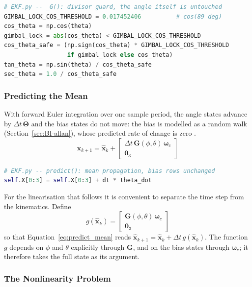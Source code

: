 \documentclass[12pt,a4paper]{article}
\newcommand{\bx}{\bm{x}}
\newcommand{\bG}{\bm{G}}
\newcommand{\bomega}{\bm{\omega}}
\newcommand{\bTheta}{\bm{\Theta}}
\begin{document}
{\begin{lstlisting}[language=Python]
# EKF.py -- _G(): divisor guard, the angle itself is untouched
GIMBAL_LOCK_COS_THRESHOLD = 0.017452406          # cos(89 deg)
cos_theta = np.cos(theta)
gimbal_lock = abs(cos_theta) < GIMBAL_LOCK_COS_THRESHOLD
cos_theta_safe = (np.sign(cos_theta) * GIMBAL_LOCK_COS_THRESHOLD
                  if gimbal_lock else cos_theta)
tan_theta = np.sin(theta) / cos_theta_safe
sec_theta = 1.0 / cos_theta_safe
\end{lstlisting}

\subsubsection{Predicting the Mean}

With forward Euler integration over one sample period, the angle
states advance by $\Delta t\,\dot{\bTheta}$ and the bias states do
not move: the bias is modelled as a random walk
(Section~\ref{sec:BI-allan}), whose predicted rate of change is zero
\citep{woodman2007introduction}.
\begin{equation}
  \hat{\bx}_{k+1} = \hat{\bx}_k +
  \begin{bmatrix}
    \Delta t\,\bG(\phi,\theta)\,\bomega_c \\
    \bm{0}_3
  \end{bmatrix}
  \label{eq:predict_mean}
\end{equation}

\begin{lstlisting}[language=Python]
# EKF.py -- predict(): mean propagation, bias rows unchanged
self.X[0:3] = self.X[0:3] + dt * theta_dot
\end{lstlisting}

For the linearisation that follows it is convenient to separate the
time step from the kinematics. Define
\begin{equation}
  g(\hat{\bx}_k) =
  \begin{bmatrix}
    \bG(\phi,\theta)\,\bomega_c \\
    \bm{0}_3
  \end{bmatrix}
  \label{eq:g_def}
\end{equation}
so that Equation~\eqref{eq:predict_mean} reads
$\hat{\bx}_{k+1} = \hat{\bx}_k + \Delta t\, g(\hat{\bx}_k)$. The
function $g$ depends on $\phi$ and $\theta$ explicitly through
$\bG$, and on the bias states through $\bomega_c$; it therefore
takes the full state as its argument.

\subsubsection{The Nonlinearity Problem}

}
\end{document}
